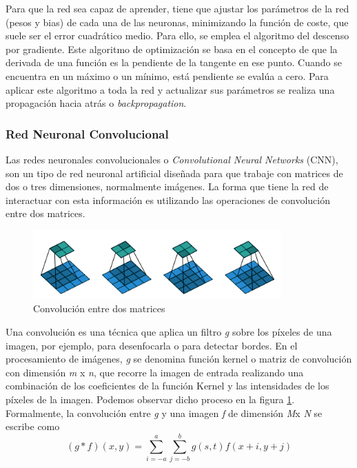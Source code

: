 Para que la red sea capaz de aprender, tiene que ajustar los parámetros de la red (pesos y bias) de cada una de las neuronas, minimizando la función de coste,
que suele ser el error cuadrático medio. Para ello, se emplea el algoritmo del descenso por gradiente.
Este algoritmo de optimización se basa en el concepto de que la derivada de una función es la pendiente de la tangente en ese punto.
Cuando se encuentra en un máximo o un mínimo, está pendiente se evalúa a cero.
Para aplicar este algoritmo a toda la red y actualizar sus parámetros se realiza una propagación hacia atrás o \textit{backpropagation}.

\subsubsection{Red Neuronal Convolucional}
Las redes neuronales convolucionales o \textit{Convolutional Neural Networks} (CNN), son un tipo de red neuronal artificial diseñada para que trabaje con matrices de dos o tres dimensiones,
normalmente imágenes. La forma que tiene la red de interactuar con esta información es utilizando las operaciones de convolución entre dos matrices.

\begin{figure}[H]
    \centering
    \includegraphics[width=0.85\textwidth, height=0.15\textheight]{Imagenes/geoAI/convolucion.png}
    \caption{Convolución entre dos matrices} \label{fig:convolucion}
\end{figure}

Una convolución es una técnica que aplica un filtro \textit{g} sobre los píxeles de una imagen, por ejemplo, para desenfocarla o para detectar bordes.
En el procesamiento de imágenes, \textit{g} se denomina función kernel o matriz de convolución con dimensión \textit{m} x \textit{n}, 
que recorre la imagen de entrada realizando una combinación de los coeficientes de la función Kernel y las intensidades de los píxeles de la imagen.
Podemos observar dicho proceso en la figura \ref{fig:convolucion}.
Formalmente, la convolución entre \textit{g} y una imagen \textit{f} de dimensión \textit{M}x \textit{N} se escribe como
\begin{equation}
    (g * f)(x,y) = \displaystyle\sum_{i=-a}^a \sum_{j=-b}^b g(s,t)f(x+i,y+j)\nonumber
\end{equation}

